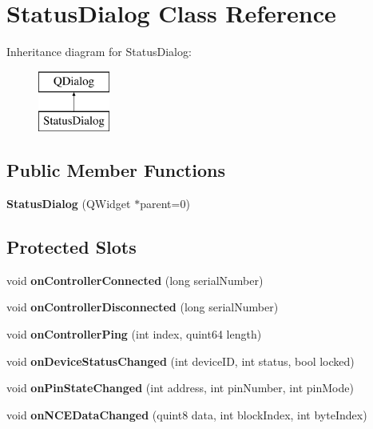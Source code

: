 \hypertarget{class_status_dialog}{}\section{Status\+Dialog Class Reference}
\label{class_status_dialog}
Inheritance diagram for Status\+Dialog\+:\begin{figure}[H]
\begin{center}
\leavevmode
\includegraphics[height=2.000000cm]{class_status_dialog}
\end{center}
\end{figure}
\subsection*{Public Member Functions}
\begin{DoxyCompactItemize}
\item 
\mbox{\label{class_status_dialog_a814831672ff09b7e3c03b61e25fe7a5d}} 
{\bfseries Status\+Dialog} (Q\+Widget $\ast$parent=0)
\end{DoxyCompactItemize}
\subsection*{Protected Slots}
\begin{DoxyCompactItemize}
\item 
\mbox{\label{class_status_dialog_a633ba41cc7be31dd2dc8dd4a405140c5}} 
void {\bfseries on\+Controller\+Connected} (long serial\+Number)
\item 
\mbox{\label{class_status_dialog_a37d4673367ef8ae402571d75ff48809b}} 
void {\bfseries on\+Controller\+Disconnected} (long serial\+Number)
\item 
\mbox{\label{class_status_dialog_a9dd8cc9ccc2786d50ac5ac2c3ff46253}} 
void {\bfseries on\+Controller\+Ping} (int index, quint64 length)
\item 
\mbox{\label{class_status_dialog_a69cd4177e5c071826634630f244b1164}} 
void {\bfseries on\+Device\+Status\+Changed} (int device\+ID, int status, bool locked)
\item 
\mbox{\label{class_status_dialog_a97af838c425027913920559f9e4e3bfe}} 
void {\bfseries on\+Pin\+State\+Changed} (int address, int pin\+Number, int pin\+Mode)
\item 
\mbox{\label{class_status_dialog_a750b9f3c081f4e04c7981a42915168be}} 
void {\bfseries on\+N\+C\+E\+Data\+Changed} (quint8 data, int block\+Index, int byte\+Index)
\end{DoxyCompactItemize}


